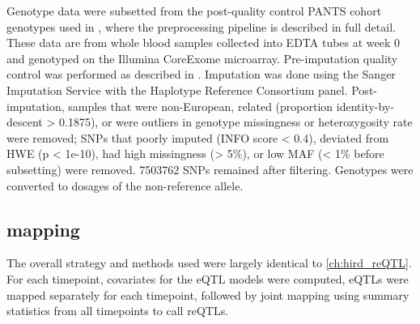 %
%
%
%

Genotype data were subsetted from the post-quality control \gls{PANTS} cohort genotypes used in \textcite{sazonovs2019HLADQA105Carriage},
where the preprocessing pipeline is described in full detail.
These data are from whole blood samples collected into EDTA tubes at week 0 and genotyped on the Illumina CoreExome microarray.
Pre-imputation quality control was performed as described in \textcite{delange2017GenomewideAssociationStudy}.
Imputation was done using the Sanger Imputation Service with the Haplotype Reference Consortium panel.
Post-imputation, samples that were non-European, related (proportion identity-by-descent > 0.1875), or were outliers in genotype missingness or heterozygosity rate were removed;
\glspl{SNP} that poorly imputed (INFO score < 0.4), deviated from \gls{HWE} (p < 1e-10), had high missingness (> 5\%), or low \gls{MAF} (< 1\% before subsetting) were removed.
\num{7503762} \glspl{SNP} remained after filtering.
Genotypes were converted to dosages of the non-reference allele.

\subsection{ mapping}

The overall strategy and methods used were largely identical to \autoref{ch:hird_reQTL}.
For each timepoint, covariates for the \gls{eQTL} models were computed, \glspl{eQTL} were mapped separately for each timepoint, followed by joint mapping using summary statistics from all timepoints to call \glspl{reQTL}.

